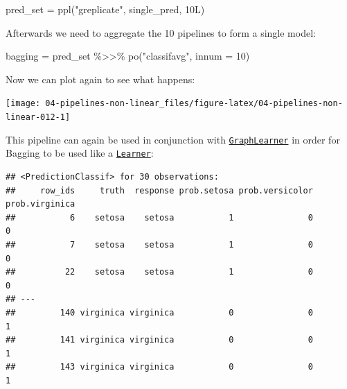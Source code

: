 \documentclass[
]{scrbook}
\newenvironment{Shaded}{\begin{snugshade}}{\end{snugshade}}
\newcommand{\AttributeTok}[1]{\textcolor[rgb]{0.77,0.63,0.00}{#1}}
\newcommand{\ConstantTok}[1]{\textcolor[rgb]{0.00,0.00,0.00}{#1}}
\newcommand{\DecValTok}[1]{\textcolor[rgb]{0.00,0.00,0.81}{#1}}
\newcommand{\FunctionTok}[1]{\textcolor[rgb]{0.00,0.00,0.00}{#1}}
\newcommand{\NormalTok}[1]{#1}
\newcommand{\OtherTok}[1]{\textcolor[rgb]{0.56,0.35,0.01}{#1}}
\newcommand{\SpecialCharTok}[1]{\textcolor[rgb]{0.00,0.00,0.00}{#1}}
\newcommand{\StringTok}[1]{\textcolor[rgb]{0.31,0.60,0.02}{#1}}
\renewenvironment{Shaded} {\begin{snugshade}\small} {\end{snugshade}}
\begin{document}
\begin{Shaded}
\begin{Highlighting}[]
\NormalTok{pred\_set }\OtherTok{=} \FunctionTok{ppl}\NormalTok{(}\StringTok{"greplicate"}\NormalTok{, single\_pred, 10L)}
\end{Highlighting}
\end{Shaded}

Afterwards we need to aggregate the 10 pipelines to form a single model:

\begin{Shaded}
\begin{Highlighting}[]
\NormalTok{bagging }\OtherTok{=}\NormalTok{ pred\_set }\SpecialCharTok{\%\textgreater{}\textgreater{}\%}
  \FunctionTok{po}\NormalTok{(}\StringTok{"classifavg"}\NormalTok{, }\AttributeTok{innum =} \DecValTok{10}\NormalTok{)}
\end{Highlighting}
\end{Shaded}

Now we can plot again to see what happens:

\begin{Shaded}
\end{Shaded}

\begin{center}\texttt{[image: 04-pipelines-non-linear\_files/figure-latex/04-pipelines-non-linear-012-1]} \end{center}

This pipeline can again be used in conjunction with \href{https://mlr3pipelines.mlr-org.com/reference/mlr_learners_graph.html}{\texttt{GraphLearner}} in order for Bagging to be used like a \href{https://mlr3.mlr-org.com/reference/Learner.html}{\texttt{Learner}}:

\begin{Shaded}
\end{Shaded}

\begin{verbatim}
## <PredictionClassif> for 30 observations:
##     row_ids     truth  response prob.setosa prob.versicolor prob.virginica
##           6    setosa    setosa           1               0              0
##           7    setosa    setosa           1               0              0
##          22    setosa    setosa           1               0              0
## ---                                                                       
##         140 virginica virginica           0               0              1
##         141 virginica virginica           0               0              1
##         143 virginica virginica           0               0              1
\end{verbatim}
\end{document}

